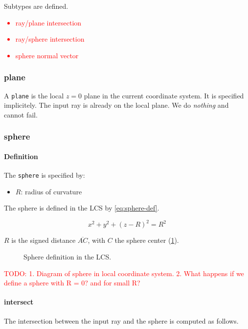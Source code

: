 Subtypes are defined.

\textcolor{red}{\begin{itemize}
\item ray/plane intersection
\item ray/sphere intersection
\item sphere normal vector
\end{itemize}}

\subsubsection{plane}
A \lstinline{plane} is the local $z=0$ plane in the current coordinate system.
It is specified implicitely.  The input ray is already on the local plane. We
do \emph{nothing} and cannot fail.

\subsubsection{sphere}

\paragraph{Definition}
The \lstinline{sphere} is specified by:

\begin{itemize}
\item $R$: radius of curvature
\end{itemize}

The sphere is defined in the \gls{LCS} by \cref{eq:sphere-def}.

\begin{equation} \label{eq:sphere-def}
x^2 + y^2 + (z - R)^2 = R^2
\end{equation}

$R$ is the signed distance $\overline{AC}$, with $C$ the sphere center
(\cref{fig:sphere-def-lcs}).

\begin{figure} \caption{\label{fig:sphere-def-lcs} Sphere definition
in the LCS.}

\end{figure}

\textcolor{red}{TODO:
1. Diagram of sphere in local coordinate system.
2. What happens if we define a sphere with R = 0? and for small R?
}

\paragraph{intersect}
The intersection between the input ray and the sphere is computed as
follows.

